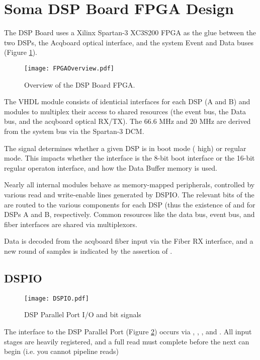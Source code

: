 

\section{Soma DSP Board FPGA Design}


The DSP Board uses a Xilinx Spartan-3 XC3S200 FPGA as the glue between
the two DSPs, the Acqboard optical interface, and the system Event and
Data buses (Figure \ref{DSPboard.FPGA}).
  
\begin{figure}
\texttt{[image: FPGAOverview.pdf]}
\caption{Overview of the DSP Board FPGA.}
\label{DSPboard.FPGA}
\end{figure}
  
The VHDL module consists of identicial interfaces for each DSP (A and
B) and modules to multiplex their access to shared resources (the
event bus, the Data bus, and the acqboard optical RX/TX). The 66.6 MHz
 and 20 MHz  are derived from the system
bus  via the Spartan-3 DCM.


The  signal determines whether a given DSP is in boot
mode ( high) or regular mode. This impacts whether the
interface is the 8-bit boot interface or the 16-bit regular operaton
interface, and how the Data Buffer memory is used.
  
Nearly all internal modules behave as memory-mapped peripherals,
controlled by various read and write-enable lines generated by DSPIO.
The relevant bits of the  are routed to the various
components for each DSP (thus the existence of 
and  for DSPs A and B, respectively. Common
resources like the data bus, event bus, and fiber interfaces are
shared via multiplexors.
  
Data is decoded from the acqboard fiber input via the Fiber RX
interface, and a new round of samples is indicated by the assertion of
.

\subsection{DSPIO}

\begin{figure}[h]
\texttt{[image: DSPIO.pdf]}
\caption{DSP Parallel Port I/O and bit signals}
\label{DSPIO}
\end{figure}

The interface to the DSP Parallel Port (Figure \ref{DSPIO}) occurs via
, , , and . All
input stages are heavily registered, and a full read must complete
before the next can begin (i.e. you cannot pipeline reads)

